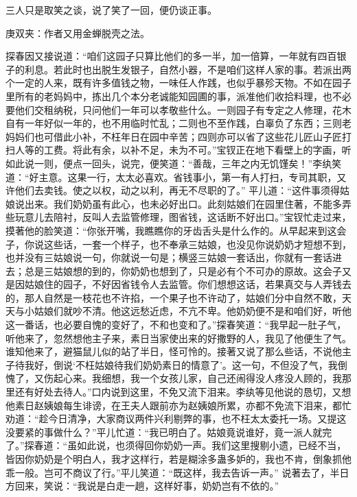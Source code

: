 \begin{parag}
    三人只是取笑之谈，说了笑了一回，便仍谈正事。\begin{note}庚双夹：作者又用金蝉脱壳之法。\end{note}探春因又接说道：“咱们这园子只算比他们的多一半，加一倍算，一年就有四百银子的利息。若此时也出脱生发银子，自然小器，不是咱们这样人家的事。若派出两个一定的人来，既有许多值钱之物，一味任人作践，也似乎暴殄天物。不如在园子里所有的老妈妈中，拣出几个本分老诚能知园圃的事，派准他们收拾料理，也不必要他们交租纳税，只问他们一年可以孝敬些什么。一则园子有专定之人修理，花木自有一年好似一年的，也不用临时忙乱；二则也不至作践，白辜负了东西；三则老妈妈们也可借此小补，不枉年日在园中辛苦；四则亦可以省了这些花儿匠山子匠打扫人等的工费。将此有余，以补不足，未为不可。”宝钗正在地下看壁上的字画，听如此说一则，便点一回头，说完，便笑道：“善哉，三年之内无饥馑矣！”李纨笑道：“好主意。这果一行，太太必喜欢。省钱事小，第一有人打扫，专司其职，又许他们去卖钱。使之以权，动之以利，再无不尽职的了。” 平儿道：“这件事须得姑娘说出来。我们奶奶虽有此心，也未必好出口。此刻姑娘们在园里住著，不能多弄些玩意儿去陪衬，反叫人去监管修理，图省钱，这话断不好出口。”宝钗忙走过来，摸著他的脸笑道：“你张开嘴，我瞧瞧你的牙齿舌头是什么作的。从早起来到这会子，你说这些话，一套一个样子，也不奉承三姑娘，也没见你说奶奶才短想不到，也并没有三姑娘说一句，你就说一句是；横竖三姑娘一套话出，你就有一套话进去；总是三姑娘想的到的，你奶奶也想到了，只是必有个不可办的原故。这会子又是因姑娘住的园子，不好因省钱令人去监管。你们想想这话，若果真交与人弄钱去的，那人自然是一枝花也不许掐，一个果子也不许动了，姑娘们分中自然不敢，天天与小姑娘们就吵不清。他这远愁近虑，不亢不卑。他奶奶便不是和咱们好，听他这一番话，也必要自愧的变好了，不和也变和了。”探春笑道：“我早起一肚子气，听他来了，忽然想他主子来，素日当家使出来的好撒野的人，我见了他便生了气。谁知他来了，避猫鼠儿似的站了半日，怪可怜的。接著又说了那么些话，不说他主子待我好，倒说‘不枉姑娘待我们奶奶素日的情意了’。这一句，不但没了气，我倒愧了，又伤起心来。我细想，我一个女孩儿家，自己还闹得没人疼没人顾的，我那里还有好处去待人。”口内说到这里，不免又流下泪来。李纨等见他说的恳切，又想他素日赵姨娘每生诽谤，在王夫人跟前亦为赵姨娘所累，亦都不免流下泪来，都忙劝道：“趁今日清净，大家商议两件兴利剔弊的事，也不枉太太委托一场。又提这没要紧的事做什么？”平儿忙道：“我已明白了。姑娘竟说谁好，竟一派人就完了。”探春道：“虽如此说，也须得回你奶奶一声。我们这里搜剔小遗，已经不当，皆因你奶奶是个明白人，我才这样行，若是糊涂多蛊多妒的，我也不肯，倒象抓他乖一般。岂可不商议了行。”平儿笑道：“既这样，我去告诉一声。” 说著去了，半日方回来，笑说：“我说是白走一趟，这样好事，奶奶岂有不依的。”
\end{parag}


